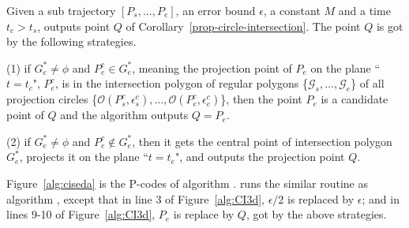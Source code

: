 %

Given a sub trajectory $[P_s,...,P_e]$, an error bound $\epsilon$, a constant $M$ and a time $t_c > t_s$, \cista outputs point $Q$ of Corollary~\ref{prop-circle-intersection}. The point $Q$ is got by the following strategies.

\vspace{1ex}
\ni (1) if $G^*_e \ne \phi$ and $P^c_e \in G^*_e$, meaning the projection point of $P_e$ on the plane ``$t=t_c$", \ie $P^c_e$, is in the intersection polygon of regular polygons \{$\mathcal{G}_s, \dots, \mathcal{G}_e$\} of all projection circles \{$\mathcal{O}(P^c_s, \epsilon^c_s), \ldots, \mathcal{O}(P^c_e, \epsilon^c_e)$\}, then the point $P_e$ is a candidate point of $Q$ and the algorithm outputs $Q=P_e$.

\vspace{1ex}
\ni (2) if $G^*_e \ne \phi$ and $P^c_e \notin G^*_e$, then it gets the central point of intersection polygon $G^*_e$, projects it on the plane ``$t=t_e$", and outputs the projection point $Q$.

\vspace{1ex}
Figure~\ref{alg:ciseda} is the P-codes of algorithm \cista. \cista runs the similar routine as algorithm \cist, except that in line 3 of Figure~\ref{alg:CI3d}, $\epsilon/2$ is replaced by $\epsilon$; and in lines 9-10 of Figure~\ref{alg:CI3d}, $P_e$ is replace by $Q$, got by the above strategies.


